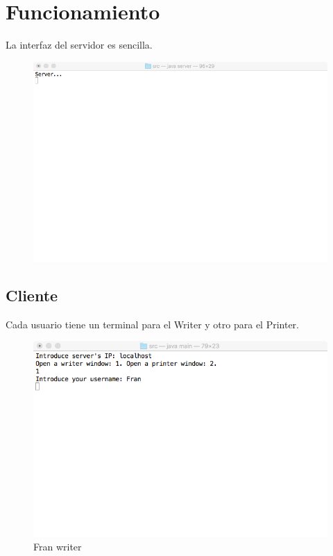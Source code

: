 \section{Funcionamiento}
La interfaz del servidor es sencilla.

\begin{figure}[H]
	\includegraphics[scale=0.65]{./Imagenes/server1.png}
\end{figure}





\subsection{Cliente}
Cada usuario tiene un terminal para el Writer y otro para el Printer.

\begin{figure}[H]
	\includegraphics[scale=0.65]{./Imagenes/franwriter1.png}
	\caption{Fran writer}
\end{figure}

